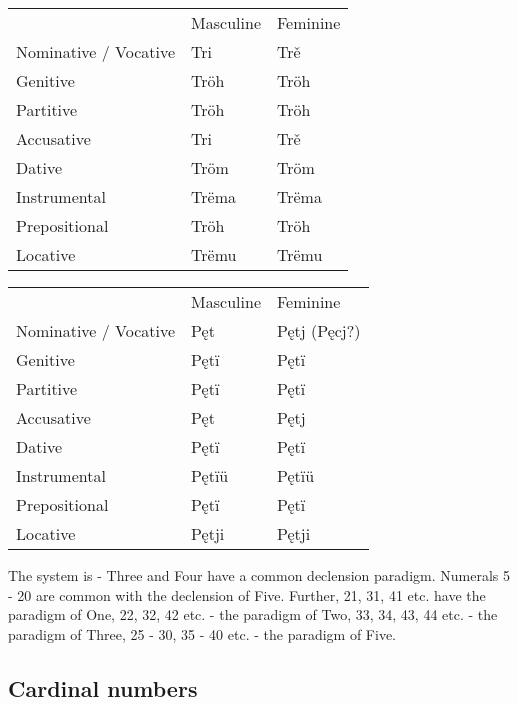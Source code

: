 \begin{table}
	\begin{tabular}{lll}
		& Masculine & Feminine \\
		Nominative / Vocative & Tri & Trě \\
		Genitive & Tröh & Tröh \\
		Partitive & Tröh & Tröh \\
		Accusative & Tri & Trě \\
		Dative & Tröm & Tröm \\
		Instrumental & Trëma & Trëma \\
		Prepositional & Tröh & Tröh \\
		Locative & Trëmu & Trëmu \\
	\end{tabular}
\end{table}

\begin{table}
	\begin{tabular}{lll}
		& Masculine & Feminine \\
		Nominative / Vocative & Pęt & Pętj (Pęcj?) \\
		Genitive & Pętï & Pętï \\
		Partitive & Pętï & Pętï \\
		Accusative & Pęt & Pętj \\
		Dative & Pętï & Pętï \\
		Instrumental & Pętïü & Pętïü \\
		Prepositional & Pętï & Pętï \\
		Locative & Pętji & Pętji \\
	\end{tabular}
\end{table}

The system is - Three and Four have a common declension paradigm. Numerals 5 - 20 are common with the declension of Five. Further, 21, 31, 41 etc. have the paradigm of One, 22, 32, 42 etc. - the paradigm of Two, 33, 34, 43, 44 etc. - the paradigm of Three, 25 - 30, 35 - 40 etc. - the paradigm of Five.

\subsection{Cardinal numbers}

